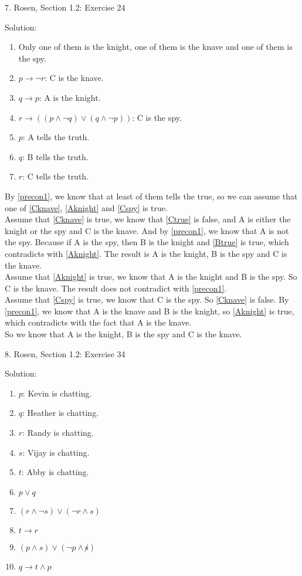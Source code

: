 \documentclass[12pt]{article}
\begin{document}
7. Rosen, Section 1.2: Exercise 24

\indent Solution:\\
\begin{enumerate}
\item \label{precon1} Only one of them is the knight, one of them is the knave and one of them is the spy.
\item \label{Cknave} $p \to \lnot r$: C is the knave.
\item \label{Aknight} $q \to p$: A is the knight.
\item \label{Cspy} $r \to ((p \land \lnot q) \lor (q \land \lnot p))$: C is the spy.
\item \label{Atrue} $p$: A tells the truth.
\item \label{Btrue} $q$: B tells the truth.
\item \label{Ctrue} $r$: C tells the truth.
\end{enumerate}

By \ref{precon1}, we know that at least of them tells the true, so we can assume that one of \ref{Cknave}, \ref{Aknight} and \ref{Cspy} is true.\\
\indent Assume that \ref{Cknave} is true, we know that \ref{Ctrue} is false, and A is either the knight or the spy and C is the knave. And by \ref{precon1}, we know that A is not the spy. Because if A is the spy, then B is the knight and \ref{Btrue} is true, which contradicts with \ref{Aknight}. The result is A is the knight, B is the spy and C is the knave.\\ 
\indent Assume that \ref{Aknight} is true, we know that A is the knight and B is the spy. So C is the knave. The result does not contradict with \ref{precon1}.\\
\indent Assume that \ref{Cspy} is true, we know that C is the spy. So \ref{Cknave} is false. By \ref{precon1}, we know that A is the knave and B is the knight, so \ref{Aknight} is true, which contradicts with the fact that A is the knave.\\
\indent So we know that A is the knight, B is the spy and C is the knave.
\newline

8. Rosen, Section 1.2: Exercise 34

\indent Solution:\\
\begin{enumerate}
\item \label{Kchat} $p$: Kevin is chatting.
\item \label{Hchat} $q$: Heather is chatting.
\item \label{Rchat} $r$: Randy is chatting.
\item \label{Vchat} $s$: Vijay is chatting.
\item \label{Achat} $t$: Abby is chatting.
\item \label{KorH} $p \lor q$
\item \label{RxorV} $(r \land \lnot s) \lor (\lnot r \land s)$
\item \label{AimpliesR} $t \to r$
\item \label{VandJ} $(p \land s) \lor (\lnot p \land \not s)$
\item \label{HimpAandK} $q \to t \land p$
\end{enumerate}
\end{document}
